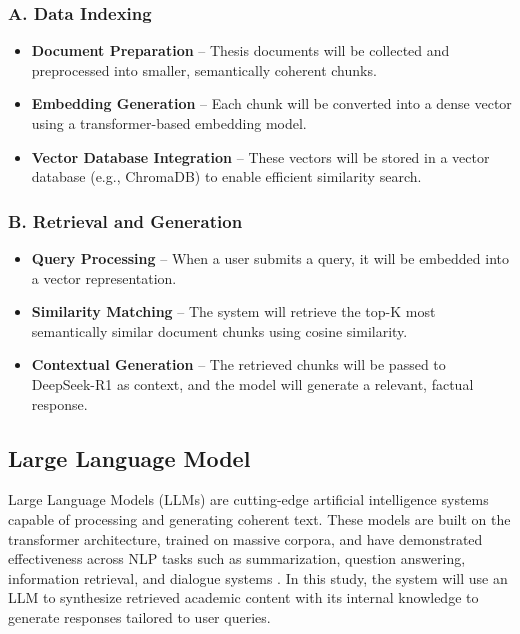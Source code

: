 \begin{refsection}
\subsubsection*{A. Data Indexing}
\begin{itemize}
    \item \textbf{Document Preparation} – Thesis documents will be collected and preprocessed into smaller, semantically coherent chunks.
    \item \textbf{Embedding Generation} – Each chunk will be converted into a dense vector using a transformer-based embedding model.
    \item \textbf{Vector Database Integration} – These vectors will be stored in a vector database (e.g., ChromaDB) to enable efficient similarity search.
\end{itemize}

\subsubsection*{B. Retrieval and Generation}
\begin{itemize}
    \item \textbf{Query Processing} – When a user submits a query, it will be embedded into a vector representation.
    \item \textbf{Similarity Matching} – The system will retrieve the top-K most semantically similar document chunks using cosine similarity.
    \item \textbf{Contextual Generation} – The retrieved chunks will be passed to DeepSeek-R1 as context, and the model will generate a relevant, factual response.
\end{itemize}

\subsection{Large Language Model}

Large Language Models (LLMs) are cutting-edge artificial intelligence systems capable of processing and generating coherent text. These models are built on the transformer architecture, trained on massive corpora, and have demonstrated effectiveness across NLP tasks such as summarization, question answering, information retrieval, and dialogue systems \citeauthor{naveed2024} \citeyear{naveed2024}. In this study, the system will use an LLM to synthesize retrieved academic content with its internal knowledge to generate responses tailored to user queries.


\end{refsection}
